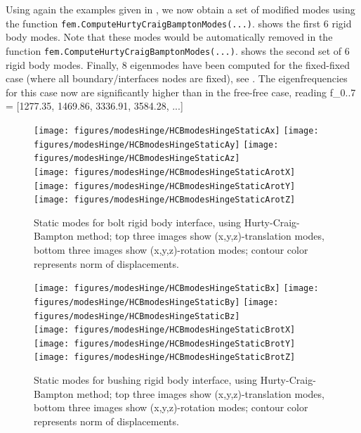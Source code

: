 Using again the examples given in , we now obtain a set of modified modes using the function \texttt{fem.ComputeHurtyCraigBamptonModes(...)}.
 shows the first 6 rigid body modes. Note that these modes would be automatically removed in the function \texttt{fem.ComputeHurtyCraigBamptonModes(...)}.
 shows the second set of 6 rigid body modes. 
Finally, 8 eigenmodes have been computed for the fixed-fixed case (where all boundary/interfaces nodes are fixed),
see . 
The eigenfrequencies for this case now are significantly higher than in the free-free case, reading
\be
  f_{0..7} = [1277.35, 1469.86, 3336.91, 3584.28, ...]
\ee
\begin{figure}[tbph]
  \begin{center}
  \texttt{[image: figures/modesHinge/HCBmodesHingeStaticAx]}
  \texttt{[image: figures/modesHinge/HCBmodesHingeStaticAy]}
  \texttt{[image: figures/modesHinge/HCBmodesHingeStaticAz]}\\
  \texttt{[image: figures/modesHinge/HCBmodesHingeStaticArotX]}
  \texttt{[image: figures/modesHinge/HCBmodesHingeStaticArotY]}
  \texttt{[image: figures/modesHinge/HCBmodesHingeStaticArotZ]}
  \end{center}
  \caption{Static modes for bolt rigid body interface, using Hurty-Craig-Bampton method; top three images show (x,y,z)-translation modes, bottom three images show (x,y,z)-rotation modes; contour color represents norm of displacements.}
	\label{fig_hingePartStaticModesA}
\end{figure}

\begin{figure}[tbph]
  \begin{center}
  \texttt{[image: figures/modesHinge/HCBmodesHingeStaticBx]}
  \texttt{[image: figures/modesHinge/HCBmodesHingeStaticBy]}
  \texttt{[image: figures/modesHinge/HCBmodesHingeStaticBz]}\\
  \texttt{[image: figures/modesHinge/HCBmodesHingeStaticBrotX]}
  \texttt{[image: figures/modesHinge/HCBmodesHingeStaticBrotY]}
  \texttt{[image: figures/modesHinge/HCBmodesHingeStaticBrotZ]}
  \end{center}
  \caption{Static modes for bushing rigid body interface, using Hurty-Craig-Bampton method; top three images show (x,y,z)-translation modes, bottom three images show (x,y,z)-rotation modes; contour color represents norm of displacements.}
	\label{fig_hingePartStaticModesB}
\end{figure}

